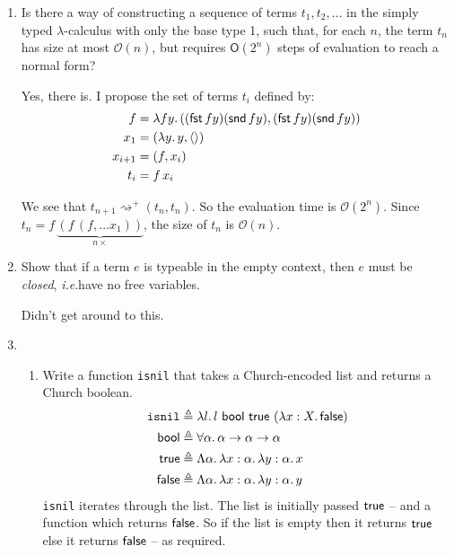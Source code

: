 \documentclass[10pt,\jkfside,a4paper]{article}
\begin{document}
\begin{enumerate}

    \item Is there a way of constructing a sequence of terms $t_1, t_2, \ldots$ in the simply typed $\lambda$-calculus with only the base type 1, such that, for each $n$, the term $t_n$ has size at most $\mathcal O(n)$, but requires $\mathsf O(2^n)$ steps of evaluation to reach a normal form?

    Yes, there is. I propose the set of terms $t_i$ defined by:
    \begin{align*}
        f &= \lambda fy\ldotp ((\mathsf{fst}\, fy)(\mathsf{snd}\, fy), (\mathsf{fst}\, fy)(\mathsf{snd}\, fy)) \\
        x_1 &= (\lambda y\ldotp y, \langle \rangle) \\
        x_{i + 1} &= (f, x_i) \\
        t_i &= f\, x_i
    \end{align*}

    We see that $t_{n + 1} \rightsquigarrow^+ (t_n, t_n)$. So the evaluation time is $\mathcal O(2^n)$. Since $t_n = f\, \underbrace{(f\, (f, \ldots x_1))}_{n\times}$, the size of $t_n$ is $\mathcal O(n)$.

    \item Show that if a term $e$ is typeable in the empty context, then $e$ must be \textit{closed}, \emph{i.e}.\@ have no free variables.

    Didn't get around to this.

    \item
    \begin{enumerate}

        \item Write a function \texttt{isnil} that takes a Church-encoded list and returns a Church boolean.
        \begin{align*}
            \texttt{isnil} &\triangleq \lambda l\ldotp l\ \mathsf{bool}\ \true\ (\lambda x: X\ldotp \false) \\
            \mathsf{bool} &\triangleq \forall \alpha\ldotp \alpha \to \alpha \to \alpha \\
            \true &\triangleq \Lambda \alpha \ldotp \lambda x: \alpha \ldotp \lambda y: \alpha \ldotp x \\
            \false &\triangleq \Lambda \alpha \ldotp \lambda x: \alpha \ldotp \lambda y: \alpha \ldotp y
        \end{align*}
        \texttt{isnil} iterates through the list. The list is initially passed $\mathsf{true}$ -- and a function which returns $\mathsf{false}$. So if the list is empty then it returns $\mathsf{true}$ else it returns $\mathsf{false}$ -- as required.


\end{enumerate}
\end{enumerate}
\end{document}
